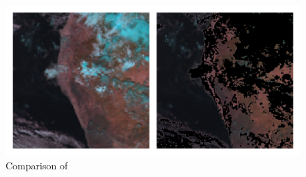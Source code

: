 \begin{figure}
    \centering
    \includegraphics{2019-01-05 122743_iterav.png}
    \caption{Comparison of }
    \label{fig:my_label}
\end{figure}